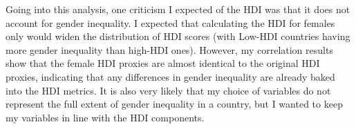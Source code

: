 \documentclass[12pt]{article}
\begin{document}
Going into this analysis, one criticism I expected of the HDI was that it does not account for gender inequality. I expected that calculating the HDI for females only would widen the distribution of HDI scores (with Low-HDI countries having more gender inequality than high-HDI ones). However, my correlation results show that the female HDI proxies are almost identical to the original HDI proxies, indicating that any differences in gender inequality are already baked into the HDI metrics. It is also very likely that my choice of variables do not represent the full extent of gender inequality in a country, but I wanted to keep my variables in line with the HDI components.
\end{document}
